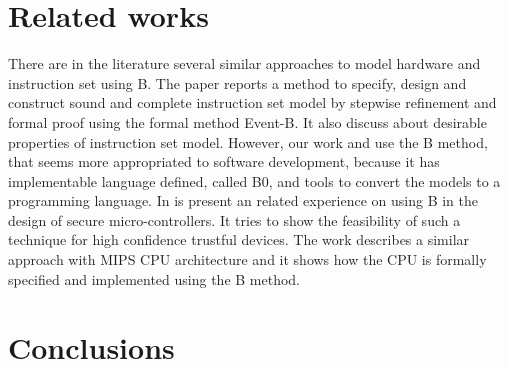 \documentclass[a4paper]{llncs}
\begin{document}
 

\section{Related works}
\label{sec:relatedworks}

There are in the literature several similar approaches to model hardware and instruction set using B.
The paper \cite{springerlink:Yuan2011} reports a method to specify, design and construct sound and complete instruction set model by stepwise refinement and formal proof using the formal method Event-B. It also discuss about desirable properties of instruction set model. However, our work \cite{Valerio_SBMF09} and \cite{Subotic2010} use the B method, that seems more appropriated to software development, because it has implementable language defined, 
called B0, and tools to convert the models to a programming language.
In \cite{Marc20113} is present an related experience on using B in the design of secure micro-controllers. It tries to show the feasibility of such a technique for high confidence trustful devices. The work \cite{Subotic2010} describes a similar approach with MIPS CPU architecture and it shows how the CPU is formally specified and implemented using the B method.


% 
%
%
%

 
\section{Conclusions}
\label{sec:conclusions} 
\end{document}
